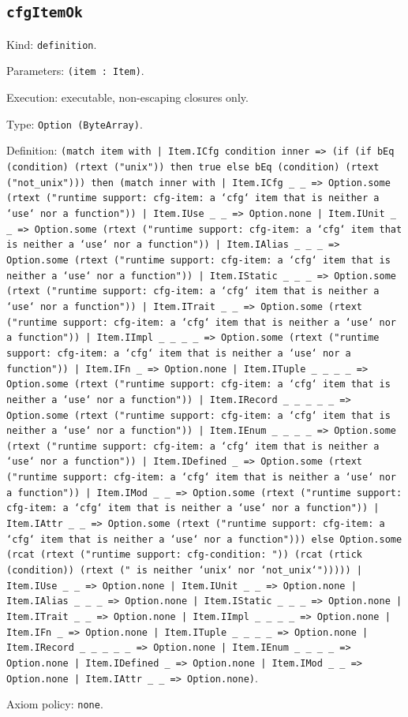 \documentclass[11pt]{article}
\begin{document}
\subsection*{\texttt{cfgItemOk}}
\noindent Kind: \texttt{definition}.\par
\noindent Parameters: \texttt{(item : Item)}.\par
\noindent Execution: executable, non-escaping closures only.\par
\noindent Type: \texttt{Option (ByteArray)}.\par
\noindent Definition: \texttt{(match item with | Item.ICfg condition inner => (if (if bEq (condition) (rtext ("unix")) then true else bEq (condition) (rtext ("not\_unix"))) then (match inner with | Item.ICfg \_ \_ => Option.some (rtext ("runtime support: cfg-item: a `cfg` item that is neither a `use` nor a function")) | Item.IUse \_ \_ => Option.none | Item.IUnit \_ \_ => Option.some (rtext ("runtime support: cfg-item: a `cfg` item that is neither a `use` nor a function")) | Item.IAlias \_ \_ \_ => Option.some (rtext ("runtime support: cfg-item: a `cfg` item that is neither a `use` nor a function")) | Item.IStatic \_ \_ \_ => Option.some (rtext ("runtime support: cfg-item: a `cfg` item that is neither a `use` nor a function")) | Item.ITrait \_ \_ => Option.some (rtext ("runtime support: cfg-item: a `cfg` item that is neither a `use` nor a function")) | Item.IImpl \_ \_ \_ \_ => Option.some (rtext ("runtime support: cfg-item: a `cfg` item that is neither a `use` nor a function")) | Item.IFn \_ => Option.none | Item.ITuple \_ \_ \_ \_ => Option.some (rtext ("runtime support: cfg-item: a `cfg` item that is neither a `use` nor a function")) | Item.IRecord \_ \_ \_ \_ \_ => Option.some (rtext ("runtime support: cfg-item: a `cfg` item that is neither a `use` nor a function")) | Item.IEnum \_ \_ \_ \_ => Option.some (rtext ("runtime support: cfg-item: a `cfg` item that is neither a `use` nor a function")) | Item.IDefined \_ => Option.some (rtext ("runtime support: cfg-item: a `cfg` item that is neither a `use` nor a function")) | Item.IMod \_ \_ => Option.some (rtext ("runtime support: cfg-item: a `cfg` item that is neither a `use` nor a function")) | Item.IAttr \_ \_ => Option.some (rtext ("runtime support: cfg-item: a `cfg` item that is neither a `use` nor a function"))) else Option.some (rcat (rtext ("runtime support: cfg-condition: ")) (rcat (rtick (condition)) (rtext (" is neither `unix` nor `not\_unix`"))))) | Item.IUse \_ \_ => Option.none | Item.IUnit \_ \_ => Option.none | Item.IAlias \_ \_ \_ => Option.none | Item.IStatic \_ \_ \_ => Option.none | Item.ITrait \_ \_ => Option.none | Item.IImpl \_ \_ \_ \_ => Option.none | Item.IFn \_ => Option.none | Item.ITuple \_ \_ \_ \_ => Option.none | Item.IRecord \_ \_ \_ \_ \_ => Option.none | Item.IEnum \_ \_ \_ \_ => Option.none | Item.IDefined \_ => Option.none | Item.IMod \_ \_ => Option.none | Item.IAttr \_ \_ => Option.none)}.\par
\noindent Axiom policy: \texttt{none}.\par
\end{document}
